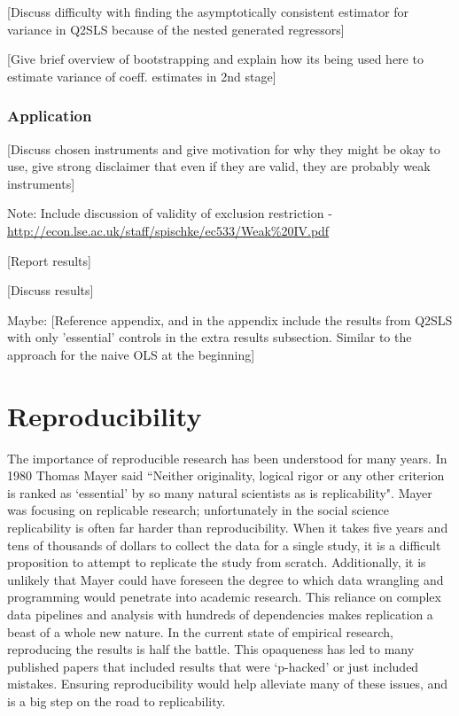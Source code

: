 \documentclass[12pt]{article}
\begin{document}
\textcolor{BrickRed}{[Discuss difficulty with finding the asymptotically consistent estimator for variance in Q2SLS because of the nested generated regressors]}

\textcolor{BrickRed}{[Give brief overview of bootstrapping and explain how its being used here to estimate variance of coeff. estimates in 2nd stage]}

\subsubsection{Application}
\textcolor{BrickRed}{[Discuss chosen instruments and give motivation for why they might be okay to use, give strong disclaimer that even if they are valid, they are probably weak instruments]}

Note: Include discussion of validity of exclusion restriction - \url{http://econ.lse.ac.uk/staff/spischke/ec533/Weak\%20IV.pdf}

\textcolor{BrickRed}{[Report results]}

\textcolor{BrickRed}{[Discuss results]}

Maybe: \textcolor{BrickRed}{[Reference appendix, and in the appendix include the results from Q2SLS with only 'essential' controls in the extra results subsection. Similar to the approach for the naive OLS at the beginning]}


\newpage
\section{Reproducibility}
The importance of reproducible research has been understood for many years. In 1980 Thomas Mayer said ``Neither originality, logical rigor or any other criterion is ranked as `essential' by so many natural scientists as is replicability". Mayer was focusing on replicable research; unfortunately in the social science replicability is often far harder than reproducibility. When it takes five years and tens of thousands of dollars to collect the data for a single study, it is a difficult proposition to attempt to replicate the study from scratch. Additionally, it is unlikely that Mayer could have foreseen the degree to which data wrangling and programming would penetrate into academic research. This reliance on complex data pipelines and analysis with hundreds of dependencies makes replication a beast of a whole new nature. In the current state of empirical research, reproducing the results is half the battle. This opaqueness has led to many published papers that included results that were `p-hacked' or just included mistakes. Ensuring reproducibility would help alleviate many of these issues, and is a big step on the road to replicability.
\end{document}
